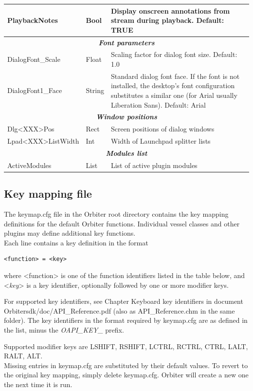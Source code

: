 \documentclass[Orbiter User Manual.tex]{subfiles}
\begin{document}
\begin{longtable}{ |p{}|p{}|p{}| }
	\hline\rule{0pt}{2ex}
	PlaybackNotes & Bool & Display onscreen annotations from stream during playback. Default: TRUE\\
	\hline
	\multicolumn{3}{|c|}{\rule{0pt}{2ex}\textbf{\textit{Font parameters}}}\\
	\hline\rule{0pt}{2ex}
	DialogFont\_Scale & Float & Scaling factor for dialog font size. Default: 1.0\\
	\hline\rule{0pt}{2ex}
	DialogFont1\_Face & String & Standard dialog font face. If the font is not installed, the desktop's font configuration substitutes a similar one (for Arial usually Liberation Sans). Default: Arial\\
	\hline
	\multicolumn{3}{|c|}{\rule{0pt}{2ex}\textbf{\textit{Window positions}}}\\
	\hline\rule{0pt}{2ex}
	Dlg<XXX>Pos & Rect & Screen positions of dialog windows\\
	\hline\rule{0pt}{2ex}
	Lpad<XXX>ListWidth & Int & Width of Launchpad splitter lists\\
	\hline
	\multicolumn{3}{|c|}{\rule{0pt}{2ex}\textbf{\textit{Modules list}}}\\
	\hline\rule{0pt}{2ex}
	ActiveModules & List & List of active plugin modules\\
	\hline
	\end{longtable}


\subsection{Key mapping file}
The keymap.cfg file in the Orbiter root directory contains the key mapping definitions for the default Orbiter functions. Individual vessel classes and other plugins may define additional key functions.\\
Each line contains a key definition in the format

\begin{lstlisting}[language=OSFS]
<function> = <key>
\end{lstlisting}

\noindent
where <function> is one of the function identifiers listed in the table below, and <\textit{key}> is a key identifier, optionally followed by one or more modifier keys.
\begin{sloppypar}%
\noindent
For supported key identifiers, see Chapter Keyboard key identifiers in document Orbitersdk/doc/API\_Reference.pdf (also as API\_Reference.chm in the same folder). The key identifiers in the format required by keymap.cfg are as defined in the list, minus the \textit{OAPI\_KEY\_} prefix.
\end{sloppypar}
\noindent
Supported modifier keys are LSHIFT, RSHIFT, LCTRL, RCTRL, CTRL, LALT, RALT, ALT.\\
Missing entries in keymap.cfg are substituted by their default values. To revert to the original key mapping, simply delete keymap.cfg. Orbiter will create a new one the next time it is run.
\end{document}
